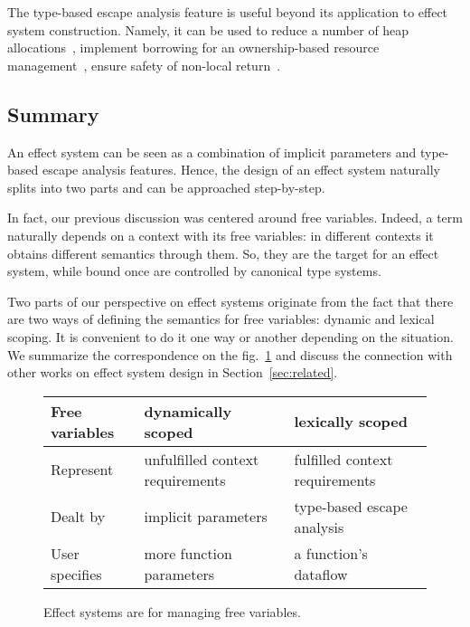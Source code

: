 \documentclass[acmsmall]{acmart}
\begin{document}
The type-based escape analysis feature is useful beyond its application to effect system construction.
Namely, it can be used to reduce a number of heap allocations~\cite{lorenzen2024oxidizing}, implement borrowing for an ownership-based resource management~\cite{matsakis2014rust, lorenzen2024oxidizing}, ensure safety of non-local return~\cite{akhin2021kotlin}.

\subsection{Summary} \label{subsec:idea-summary}

An effect system can be seen as a combination of implicit parameters and type-based escape analysis features.
Hence, the design of an effect system naturally splits into two parts and can be approached step-by-step.

In fact, our previous discussion was centered around free variables.
Indeed, a term naturally depends on a context with its free variables: in different contexts it obtains different semantics through them.
So, they are the target for an effect system, while bound once are controlled by canonical type systems.

Two parts of our perspective on effect systems originate from the fact that there are two ways of defining the semantics for free variables: dynamic and lexical scoping.
It is convenient to do it one way or another depending on the situation.
We summarize the correspondence on the fig.\ \ref{fig:free-vars} and discuss the connection with other works on effect system design in Section\ \ref{sec:related}.

\begin{figure}
    \centering
    \begin{tabular}{|l|l|l|}
        \hline
        Free variables & dynamically scoped & lexically scoped \\
        \hline
        Represent & unfulfilled context requirements & fulfilled context requirements \\
        Dealt by & implicit parameters & type-based escape analysis \\
        User specifies & more function parameters & a function’s dataflow \\ %
        \hline
    \end{tabular}
    \caption{Effect systems are for managing free variables.}
    \label{fig:free-vars}
\end{figure}
\end{document}
